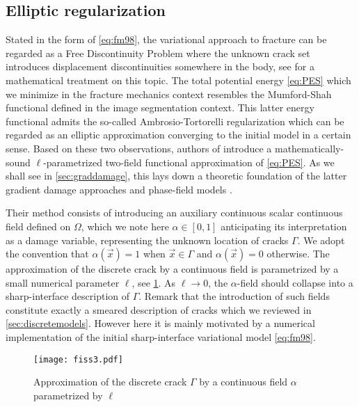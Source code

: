 \subsection{Elliptic regularization} \label{sec:ellipticregul}
Stated in the form of \eqref{eq:fm98}, the variational approach to fracture can be regarded as a Free Discontinuity Problem where the unknown crack set introduces displacement discontinuities somewhere in the body, see \cite{Braides:1998aa} for a mathematical treatment on this topic. The total potential energy \eqref{eq:PES} which we minimize in the fracture mechanics context resembles the Mumford-Shah functional \cite{Mumford:1989aa} defined in the image segmentation context. This latter energy functional admits the so-called Ambrosio-Tortorelli regularization \cite{Ambrosio:1990aa} which can be regarded as an elliptic approximation converging to the initial model in a certain sense. Based on these two observations, authors of \cite{BourdinFrancfortMarigo:2000} introduce a mathematically-sound $\ell$-parametrized two-field functional approximation of \eqref{eq:PES}. As we shall see in \cref{sec:graddamage}, this lays down a theoretic foundation of the latter gradient damage approaches \cite{PhamAmorMarigoMaurini:2011} and phase-field models \cite{MieheHofackerWelschinger:2010}.

Their method consists of introducing an auxiliary continuous scalar continuous field defined on $\Omega$, which we note here $\alpha\in[0,1]$ anticipating its interpretation as a damage variable, representing the unknown location of cracks $\Gamma$. We adopt the convention that $\alpha(\vec{x})=1$ when $\vec{x}\in\Gamma$ and $\alpha(\vec{x})=0$ otherwise. The approximation of the discrete crack by a continuous field is parametrized by a small numerical parameter $\ell$, see \cref{fig:fiss3}. As $\ell\to 0$, the $\alpha$-field should collapse into a sharp-interface description of $\Gamma$. Remark that the introduction of such fields constitute exactly a smeared description of cracks which we reviewed in \cref{sec:discretemodels}. However here it is mainly motivated by a numerical implementation of the initial sharp-interface variational model \eqref{eq:fm98}.
\begin{figure}[htbp]
\centering
\texttt{[image: fiss3.pdf]}
\caption{Approximation of the discrete crack $\Gamma$ by a continuous field $\alpha$ parametrized by $\ell$} \label{fig:fiss3}
\end{figure}

